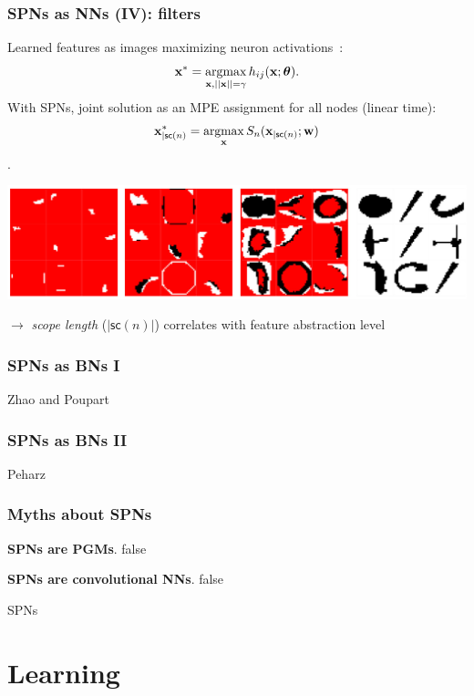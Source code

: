 \documentclass[10pt, t, xcolor={usenames,dvipsnames,svgnames}, compress]{beamer}
\newcommand{\argmax}{\operatornamewithlimits{argmax}}
\begin{document}
\begin{frame}
  \frametitle{SPNs as NNs (IV): filters}
  \small
  Learned features as images maximizing neuron activations~\parencite{Erhan2009}:
  $$\mathbf{x}^{*} = \argmax_{\mathbf{x},
    ||\mathbf{x}||=\gamma}h_{ij}(\mathbf{x};\boldsymbol\theta).$$
  With SPNs, joint solution as an MPE assignment for all nodes (linear time):
  $$\mathbf{x}^{*}_{|\mathsf{sc}(n)} =
  \argmax_{\mathbf{x}}S_{n}(\mathbf{x}_{|\mathsf{sc}(n)};
  \mathbf{w})$$.
  \begin{center}
    \vspace{-15pt}
    \includegraphics[width=0.9\linewidth]{figures/filters.jpg}
  \end{center}
  $\rightarrow$ \emph{scope length} ($|\mathsf{sc}(n)|$) correlates with feature abstraction level
\end{frame}

\begin{frame}
  \frametitle{SPNs as BNs I}
  Zhao and Poupart
\end{frame}

\begin{frame}
  \frametitle{SPNs as BNs II}
  Peharz
\end{frame}

\begin{frame}
  \frametitle{Myths about SPNs}
 \textbf{SPNs are PGMs}. false

 \textbf{SPNs are convolutional NNs}. false

  SPNs 
\end{frame}

\section{Learning}
{
  \begin{frame}[c]
    \sectionpage
  \end{frame}
}
\end{document}
